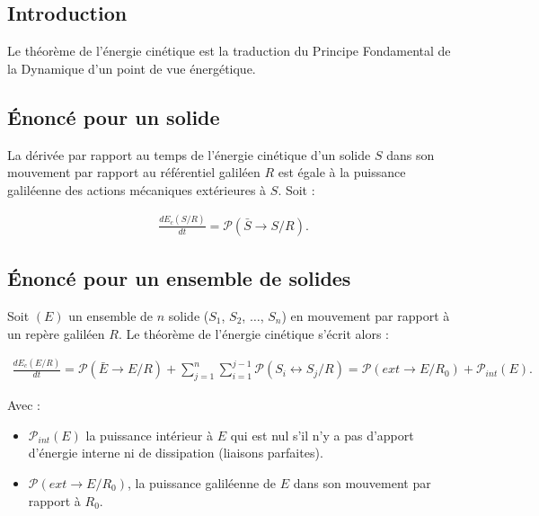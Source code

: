 \documentclass[a4paper,10pt]{article}
\begin{document}
\subsection{Introduction}
Le théorème de l'énergie cinétique est la traduction du Principe Fondamental de la Dynamique d'un point de vue énergétique.
\subsection{Énoncé pour un solide}

\begin{theoreme}
La dérivée par rapport au temps de l'énergie cinétique d'un solide $S$ dans son mouvement par rapport au référentiel galiléen $R$ est égale à la puissance galiléenne des actions mécaniques extérieures à $S$.
Soit :

\begin{align}
\boxed{
\frac{dE_c(S/R)}{dt}=\mathcal{P}(\bar S \rightarrow S/R).
}
\end{align}

\end{theoreme}





\subsection{Énoncé pour un ensemble de solides}

\begin{theoreme}
Soit $(E)$ un ensemble de $n$ solide ($S_1$, $S_2$, $\ldots$, $S_n$) en mouvement par rapport à un repère galiléen $R$. Le théorème de l'énergie cinétique s'écrit alors :

\begin{align}
\boxed{
\frac{dE_c(E/R)}{dt}=\mathcal{P}(\bar E \rightarrow E/R)+ \displaystyle{\sum^n_{j=1}}\displaystyle{\sum^{j-1}_{i=1}}\mathcal{P}(S_i \leftrightarrow S_j/R)=\mathcal{P}(ext\rightarrow E/R_0)+\mathcal{P}_{int}(E).
}
\end{align}

Avec :
\begin{itemize}
\item $\mathcal{P}_{int}(E)$ la puissance intérieur à $E$ qui est nul s'il n'y a pas d'apport d'énergie interne ni de dissipation (liaisons parfaites).
\item $\mathcal{P}(ext\rightarrow E/R_0)$, la puissance galiléenne de $E$ dans son mouvement par rapport à $R_0$.
\end{itemize}

\end{theoreme}
\end{document}
